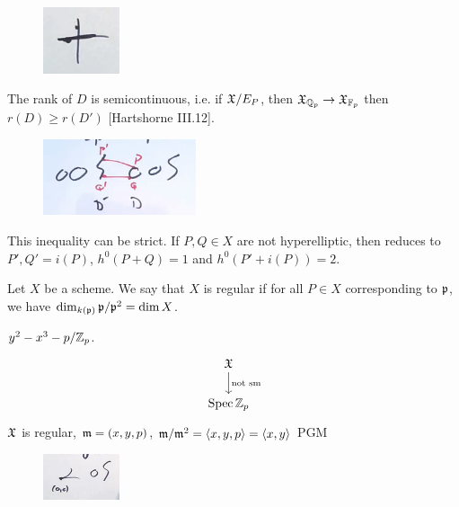	\begin{figure}[!ht]
	\centering
	\includegraphics[width=0.2\textwidth]{../images/im19.png}
	\end{figure}


The rank of $D$ is semicontinuous, i.e. if $\mathfrak{X}/E_P$, then $\mathfrak{X}_{\mathbb{Q}_p} \to \mathfrak{X}_{\mathbb{F}_p}$ then $r(D) \geq r(D')$ [Hartshorne III.12]. 


	\begin{figure}[!ht]
	\centering
	\includegraphics[width=0.4\textwidth]{../images/im20.png}
	\end{figure}


\begin{rem}
This inequality can be strict. If $P,Q \in X$ are not hyperelliptic, then reduces to $P',Q'= i(P)$, $h^0(P+Q)= 1$ and $h^0(P' + i(P))= 2$.
\end{rem}


\begin{dfn}[Regular]
Let $X$ be a scheme. We say that $X$ is regular if for all $P \in X$ corresponding to $\mathfrak{p}$, we have $\dim_{k(\mathfrak{p})} \mathfrak{p}/\mathfrak{p}^2= \dim X$.
\end{dfn}


\begin{ex}
$y^2 - x^3- p/\mathbb{Z}_p$. 
	\[
	\begin{tikzcd}
	\fX \arrow{d}{\text{not sm}} \\
	\spec \Z_p
	\end{tikzcd}
	\]
$\mathfrak{X}$ is regular, $\mathfrak{m}= (x,y,p)$, $\mathfrak{m}/\mathfrak{m}^2= \langle x,y,p \rangle= \langle x,y \rangle$ PGM
\end{ex}


	\begin{figure}[!ht]
	\centering
	\includegraphics[width=0.2\textwidth]{../images/im21.png}
	\end{figure}


